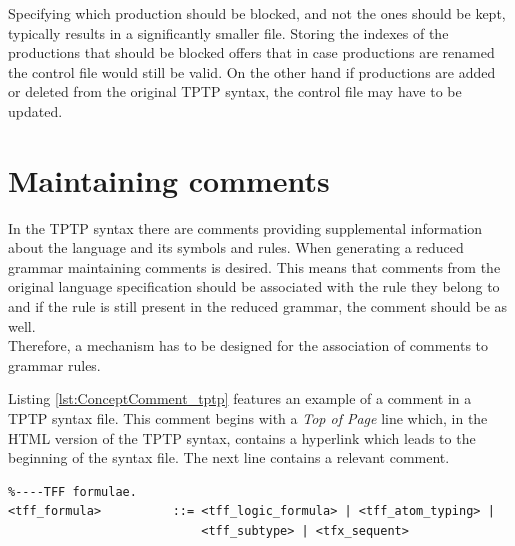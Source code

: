 Specifying which production should be blocked, and not the ones should be kept, typically results in a significantly smaller file.
Storing the indexes of the productions that should be blocked offers that in case productions are renamed the control file would still be valid. On the other hand if productions are added or deleted from the original \ac{TPTP} syntax, the control file may have to be updated.

\section{Maintaining comments}\label{sec:ConceptMaintainingComments}

In the \ac{TPTP} syntax there are comments providing supplemental information about the language and its symbols and rules.
When generating a reduced grammar maintaining comments is desired. This means that comments from the original language specification should be associated with the rule they belong to and if the rule is still present in the reduced grammar, the comment should be as well.\\
Therefore, a mechanism has to be designed for the association of comments to grammar rules.

Listing \ref{lst:ConceptComment_tptp} features an example of a comment in a \ac{TPTP} syntax file. This comment begins with a \textit{Top of Page} line which, in the HTML version of the \ac{TPTP} syntax, contains a hyperlink which leads to the beginning of the syntax file.
The next line contains a relevant comment.\\
\begin{lstlisting}[language=none, basicstyle=\scriptsize	,caption= Example of a comment in the \ac{TPTP} syntax, label= lst:ConceptComment_tptp]
%----Top of Page---------------------------------------------------------------
%----TFF formulae.
<tff_formula>          ::= <tff_logic_formula> | <tff_atom_typing> |
                           <tff_subtype> | <tfx_sequent>
\end{lstlisting}

